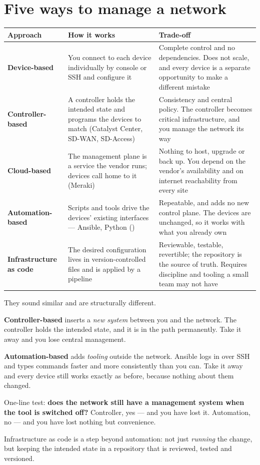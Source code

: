 \section{Five ways to manage a network}

\begin{longtable}{@{}L{3.1cm}L{5.7cm}L{6.1cm}@{}}
\toprule
{}
\textbf{Approach} & \textbf{How it works} & \textbf{Trade-off} \\
\midrule
\endhead
\textbf{Device-based} &
You connect to each device individually by console or SSH and configure it &
Complete control and no dependencies. Does not scale, and every device is a
separate opportunity to make a different mistake \\
\textbf{Controller-based} &
A controller holds the intended state and programs the devices to match
(Catalyst Center, SD-WAN, SD-Access) &
Consistency and central policy. The controller becomes critical
infrastructure, and you manage the network its way \\
\textbf{Cloud-based} &
The management plane is a service the vendor runs; devices call home to it
(Meraki) &
Nothing to host, upgrade or back up. You depend on the vendor's availability
and on internet reachability from every site \\
\textbf{Automation-based} &
Scripts and tools drive the devices' existing interfaces --- Ansible, Python
() &
Repeatable, and adds no new control plane. The devices are unchanged, so it
works with what you already own \\
\textbf{Infrastructure as code} &
The desired configuration lives in version-controlled files and is applied by a
pipeline &
Reviewable, testable, revertible; the repository is the source of truth.
Requires discipline and tooling a small team may not have \\
\bottomrule
\end{longtable}

\begin{alertbox}
They sound similar and are structurally different.

\textbf{Controller-based} inserts a \emph{new system} between you and the
network. The controller holds the intended state, and it is in the path
permanently. Take it away and you lose central management.

\textbf{Automation-based} adds \emph{tooling} outside the network. Ansible logs
in over SSH and types commands faster and more consistently than you can. Take it
away and every device still works exactly as before, because nothing about them
changed.

One-line test: \textbf{does the network still have a management system when the
tool is switched off?} Controller, yes --- and you have lost it. Automation, no
--- and you have lost nothing but convenience.

Infrastructure as code is a step beyond automation: not just \emph{running} the
change, but keeping the intended state in a repository that is reviewed, tested
and versioned.
\end{alertbox}

